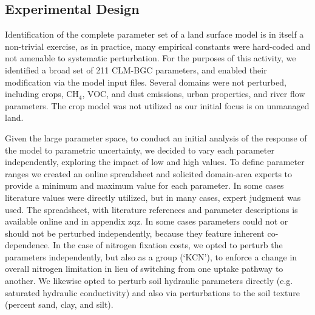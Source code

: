 \documentclass[draft]{agujournal2019}
\begin{document}
\subsection{Experimental Design}
Identification of the complete parameter set of a land surface model is in itself a non-trivial exercise, as in practice, many empirical constants were hard-coded and not amenable to systematic perturbation. For the purposes of this activity, we identified a broad set of 211 CLM-BGC parameters, and enabled their modification via the model input files. Several domains were not perturbed, including crops, CH$_4$, VOC, and dust emissions, urban properties, and river flow parameters. The crop model was not utilized as our initial focus is on unmanaged land.

Given the large parameter space, to conduct an initial analysis of the response of the model to parametric uncertainty, we decided to vary each parameter independently, exploring the impact of low and high values. To define parameter ranges we created an online spreadsheet and solicited domain-area experts to provide a minimum and maximum value for each parameter. In some cases literature values were directly utilized, but in many cases, expert judgment was used. The spreadsheet, with literature references and parameter descriptions is available online and in appendix zqz. In some cases parameters could not or should not be perturbed independently, because they feature inherent co-dependence. In the case of nitrogen fixation costs, we opted to perturb the parameters independently, but also as a group (`KCN'), to enforce a change in overall nitrogen limitation in lieu of switching from one uptake pathway to another. We likewise opted to perturb soil hydraulic parameters directly (e.g. saturated hydraulic conductivity) and also via perturbations to the soil texture (percent sand, clay, and silt).
\end{document}
